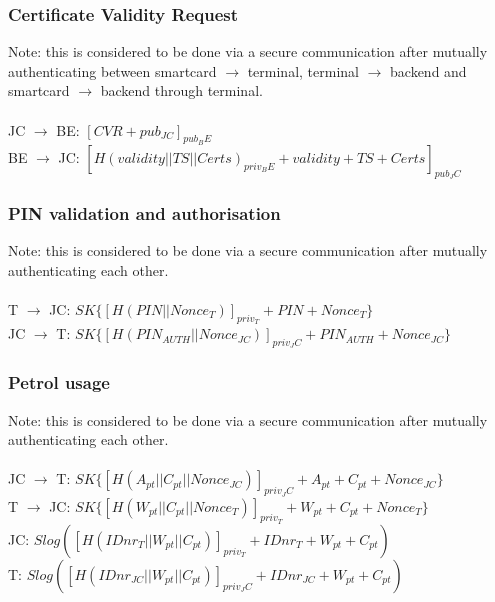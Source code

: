 
\subsubsection{Certificate Validity Request}
Note: this is considered to be done via a secure communication after mutually authenticating between smartcard $\to$ terminal, terminal $\to$ backend and smartcard $\to$ backend through terminal.
\\
\\
JC $\to$ BE: $[CVR + pub_{JC}]_{pub_BE}$\\
BE $\to$ JC: $[H(validity||TS||Certs)_{priv_BE}+validity+TS+Certs]_{pub_JC}$\\

\subsubsection{PIN validation and authorisation}
Note: this is considered to be done via a secure communication after mutually authenticating each other.
\\
\\
T $\to$ JC: $SK\{[H(PIN||Nonce_{T})]_{priv_T}+PIN+Nonce_{T}\}$\\
JC $\to$ T: $SK\{[H(PIN_{AUTH}||Nonce_{JC})]_{priv_JC}+PIN_{AUTH}+Nonce_{JC}\}$\\

\subsubsection{Petrol usage}
Note: this is considered to be done via a secure communication after mutually authenticating each other.
\\
\\
JC $\to$ T: $SK\{[H(A_{pt}||C_{pt}||Nonce_{JC})]_{priv_JC}+A_{pt}+C_{pt}+Nonce_{JC}\}$\\
T $\to$ JC: $SK\{[H(W_{pt}||C_{pt}||Nonce_{T})]_{priv_T}+W_{pt}+C_{pt}+Nonce_{T}\}$\\
JC: $Slog([H(IDnr_{T}||W_{pt}||C_{pt})]_{priv_T}+IDnr_{T}+W_{pt}+C_{pt})$\\
T: $Slog([H(IDnr_{JC}||W_{pt}||C_{pt})]_{priv_JC}+IDnr_{JC}+W_{pt}+C_{pt})$\\
